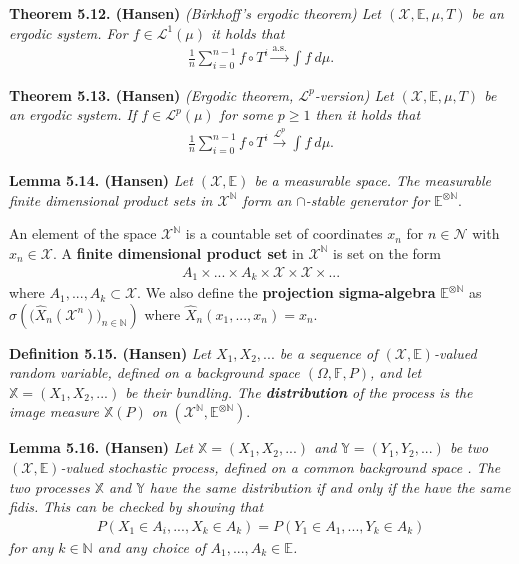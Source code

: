 \documentclass[a4paper,12pt,openany]{book}
\begin{document}
\textbf{Theorem 5.12. (Hansen)} \emph{(Birkhoff's ergodic theorem) Let \((\mathcal{X},\mathbb{E},\mu,T)\) be an ergodic system. For \(f\in \mathcal{L}^1(\mu)\) it holds that}
\begin{align*}
    \frac{1}{n}\sum_{i=0}^{n-1}f\circ T^i\stackrel{\text{a.s.}}{\to} \int f\ d\mu.\tag{5.16}
\end{align*}

\textbf{Theorem 5.13. (Hansen)} \emph{(Ergodic theorem, \(\mathcal{L}^p\)-version) Let \((\mathcal{X},\mathbb{E},\mu,T)\) be an ergodic system. If \(f\in \mathcal{L}^p(\mu)\) for some \(p\ge 1\) then it holds that}
\begin{align*}
    \frac{1}{n}\sum_{i=0}^{n-1}f\circ T^i\stackrel{\mathcal{L}^p}{\to}\int f\ d\mu.\tag{5.21}
\end{align*}

\textbf{Lemma 5.14. (Hansen)} \emph{Let \((\mathcal{X},\mathbb{E})\) be a measurable space. The measurable finite dimensional product sets in \(\mathcal{X}^{\mathbb{N}}\) form an \(\cap\)-stable generator for} \({\mathbb{E}}^{\otimes\mathbb{N}}\).

An element of the space \(\mathcal{X}^{\mathbb{N}}\) is a countable set of coordinates \(x_n\) for \(n\in\mathcal{N}\) with \(x_n\in\mathcal{X}\). A \textbf{finite dimensional product set} in \(\mathcal{X}^{\mathbb{N}}\) is set on the form
\begin{align*}
    A_1\times ... \times A_k\times \mathcal{X}\times \mathcal{X}\times ...
\end{align*}
where \(A_1,...,A_k\subset \mathcal{X}\). We also define the \textbf{projection sigma-algebra} \(\mathbb{E}^{\otimes \mathbb{N}}\) as \(\sigma\left(\big(\hat{X}_n(\mathcal{X}^n)\big)_{n\in\mathbb{N}}\right)\) where \(\hat{X}_n(x_1,...,x_n)=x_n\).

\textbf{Definition 5.15. (Hansen)} \emph{Let \(X_1,X_2,...\) be a sequence of \((\mathcal{X},\mathbb{E})\)-valued random variable, defined on a background space \((\Omega,\mathbb{F},P)\), and let \(\mathbb{X}=(X_1,X_2,...)\) be their bundling. The \textbf{distribution} of the process is the image measure \(\mathbb{X}(P)\) on} \((\mathcal{X}^{\mathbb{N}},{\mathbb{E}}^{\otimes \mathbb{N}})\).

\textbf{Lemma 5.16. (Hansen)} \emph{Let \(\mathbb{X}=(X_1,X_2,...)\) and \(\mathbb{Y}=(Y_1,Y_2,...)\) be two \((\mathcal{X},\mathbb{E})\)-valued stochastic process, defined on a common background space . The two processes \(\mathbb{X}\) and \(\mathbb{Y}\) have the same distribution if and only if the have the same fidis.}
\emph{This can be checked by showing that}
\begin{align*}
    P(X_1\in A_i,...,X_k\in A_k)=P(Y_1\in A_1,...,Y_k\in A_k)\tag{5.25}
\end{align*}
\emph{for any \(k\in\mathbb{N}\) and any choice of \(A_1,...,A_k\in\mathbb{E}\).}
\end{document}
